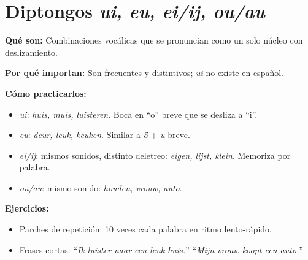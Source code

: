 \section{Diptongos \textit{ui, eu, ei/ij, ou/au}}
\textbf{Qué son:} Combinaciones vocálicas que se pronuncian como un solo núcleo con deslizamiento.

\textbf{Por qué importan:} Son frecuentes y distintivos; \textit{ui} no existe en español.

\textbf{Cómo practicarlos:}
\begin{itemize}[leftmargin=*]
\item \textit{ui}: \textit{huis, muis, luisteren}. Boca en ``o'' breve que se desliza a ``i''.
  \item \textit{eu}: \textit{deur, leuk, keuken}. Similar a \textit{ö} + \textit{u} breve.
  \item \textit{ei/ij}: mismos sonidos, distinto deletreo: \textit{eigen, lijst, klein}. Memoriza por palabra.
  \item \textit{ou/au}: mismo sonido: \textit{houden, vrouw, auto}.
\end{itemize}

\textbf{Ejercicios:}
\begin{itemize}[leftmargin=*]
  \item Parches de repetición: 10 veces cada palabra en ritmo lento-rápido.
  \item Frases cortas: ``\textit{Ik luister naar een leuk huis.}'' ``\textit{Mijn vrouw koopt een auto.}''
\end{itemize}
